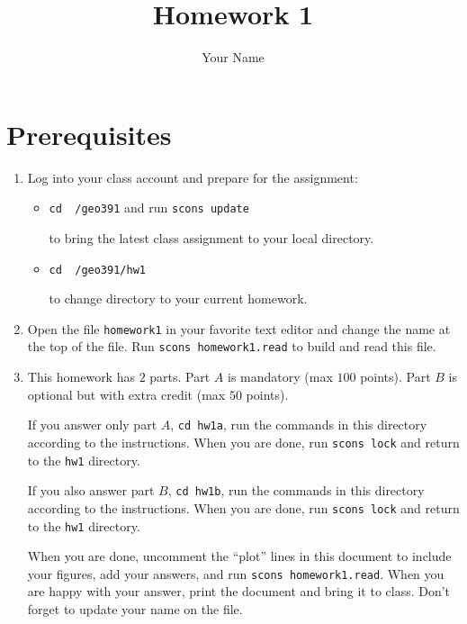 \author{Your Name}
\title{Homework 1}




\section{Prerequisites}

\begin{enumerate}
\item Log into your class account and prepare for the assignment:

\begin{itemize}
\item \texttt{cd ~/geo391} and run \texttt{scons update} \par
to bring the latest class assignment to your local directory.
\item \texttt{cd ~/geo391/hw1} \par
to change directory to your current homework.
\end{itemize}

\item Open the file \texttt{homework1} in your favorite text editor
and change the name at the top of the file.
Run \texttt{scons homework1.read} to build and read this file.

\item This homework has $2$ parts. 
Part $A$ is mandatory (max $100$ points).
Part $B$ is optional but with extra credit (max $50$ points).

If you answer only part $A$, \texttt{cd hw1a},
run the commands in this directory according to the 
instructions. When you are done, run \texttt{scons lock} and
return to the \texttt{hw1} directory.

If you also answer part $B$, \texttt{cd hw1b},
run the commands in this directory according to the 
instructions. When you are done, run \texttt{scons lock} and
return to the \texttt{hw1} directory.

When you are done, uncomment the ``plot'' lines in this document
to include your figures, add your answers, and run
\texttt{scons homework1.read}. 
When you are happy with your answer, print the document and
bring it to class. Don't forget to update your name on the file.

\end{enumerate}


